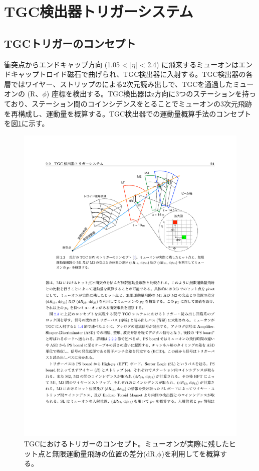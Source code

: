 \section{TGC検出器トリガーシステム}
\label{sec_TGCtrigger}

    \subsection{TGCトリガーのコンセプト}

衝突点からエンドキャップ方向 (1.05 < |$\eta$| < 2.4) に飛来するミューオンはエンドキャップトロイド磁石で曲げられ、TGC検出器に入射する。TGC検出器の各層ではワイヤー、ストリップのによる2次元読み出しで、TGCを通過したミューオンの (R、$\phi$) 座標を検出する。TGC検出器はz方向に3つのステーションを持っており、ステーション間のコインシデンスをとることでミューオンの3次元飛跡を再構成し、運動量を概算する。TGC検出器での運動量概算手法のコンセプトを図\ref{TGC_triggerconcept}に示す。

\begin{figure} 
\centering
\includegraphics[width=16cm]{fig/Intro/TGC_triggerconcept.pdf}
\caption[TGCにおけるトリガーのコンセプト]{TGCにおけるトリガーのコンセプト\cite{mt_akatsuka}。ミューオンが実際に残したヒット点と無限運動量飛跡の位置の差分($\mathrm{dR}$,$\mathrm{\phi}$)を利用して\pt を概算する。}
\label{TGC_triggerconcept}
\end{figure}

